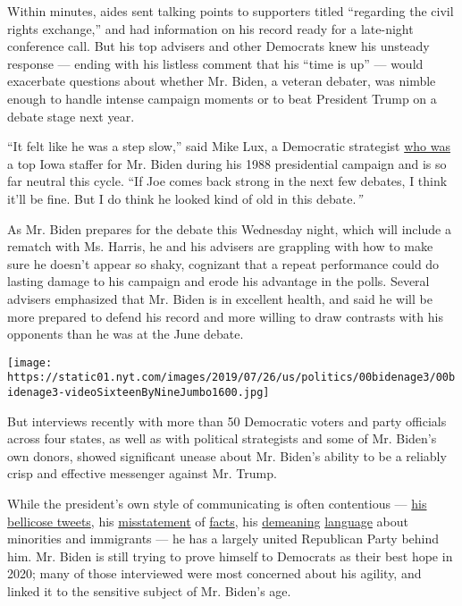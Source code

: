 Within minutes, aides sent talking points to supporters titled
``regarding the civil rights exchange,'' and had information on his
record ready for a late-night conference call. But his top advisers and
other Democrats knew his unsteady response --- ending with his listless
comment that his ``time is up'' --- would exacerbate questions about
whether Mr. Biden, a veteran debater, was nimble enough to handle
intense campaign moments or to beat President Trump on a debate stage
next year.

``It felt like he was a step slow,'' said Mike Lux, a Democratic
strategist
\href{https://www.nytimes.com/2019/06/03/us/politics/biden-1988-presidential-campaign.html}{who
was} a top Iowa staffer for Mr. Biden during his 1988 presidential
campaign and is so far neutral this cycle. ``If Joe comes back strong in
the next few debates, I think it'll be fine. But I do think he looked
kind of old in this debate.\emph{''}

As Mr. Biden prepares for the debate this Wednesday night, which will
include a rematch with Ms. Harris, he and his advisers are grappling
with how to make sure he doesn't appear so shaky, cognizant that a
repeat performance could do lasting damage to his campaign and erode his
advantage in the polls. Several advisers emphasized that Mr. Biden is in
excellent health, and said he will be more prepared to defend his record
and more willing to draw contrasts with his opponents than he was at the
June debate.

\texttt{[image: https://static01.nyt.com/images/2019/07/26/us/politics/00bidenage3/00bidenage3-videoSixteenByNineJumbo1600.jpg]}

But interviews recently with more than 50 Democratic voters and party
officials across four states, as well as with political strategists and
some of Mr. Biden's own donors, showed significant unease about Mr.
Biden's ability to be a reliably crisp and effective messenger against
Mr. Trump.

While the president's own style of communicating is often contentious
---
\href{https://www.nytimes.com/2019/07/16/us/politics/trump-tweet-house-vote.html}{his
bellicose tweets}, his
\href{https://www.nytimes.com/2019/07/15/us/politics/trump-fact-check-ilhan-omar.html}{misstatement}
of
\href{https://www.nytimes.com/2019/07/08/us/politics/trump-environmental-record-fact-check.html}{facts},
his
\href{https://www.nytimes.com/2019/07/27/us/politics/trump-elijah-cummings.html}{demeaning}
\href{https://www.nytimes.com/2019/07/20/us/politics/trump-race-record.html}{language}
about minorities and immigrants --- he has a largely united Republican
Party behind him. Mr. Biden is still trying to prove himself to
Democrats as their best hope in 2020; many of those interviewed were
most concerned about his agility, and linked it to the sensitive subject
of Mr. Biden's age.

